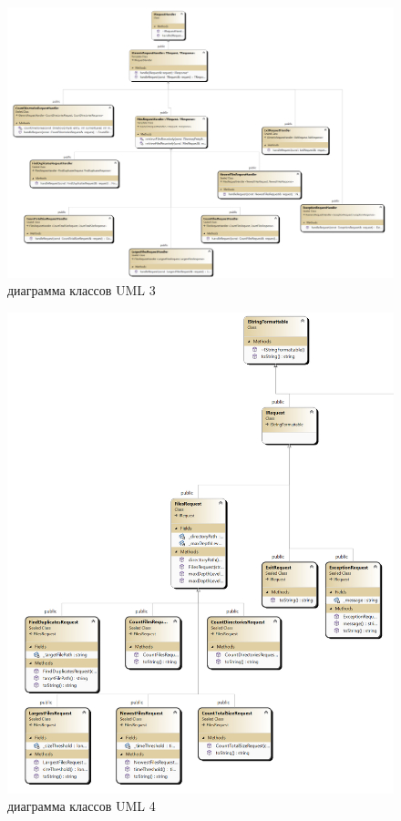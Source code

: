 \begin{figure}[ht] 
	\center
	\includegraphics [scale=0.35] {my_folder/images/uml5.png}
	\caption{диаграмма классов UML 3} 
	\label{fig:uml3}  
\end{figure}\newpage
\begin{figure}[ht] 
	\center
	\includegraphics [scale=0.4] {my_folder/images/uml6.png}
	\caption{диаграмма классов UML 4} 
	\label{fig:uml4}  
\end{figure}\newpage
